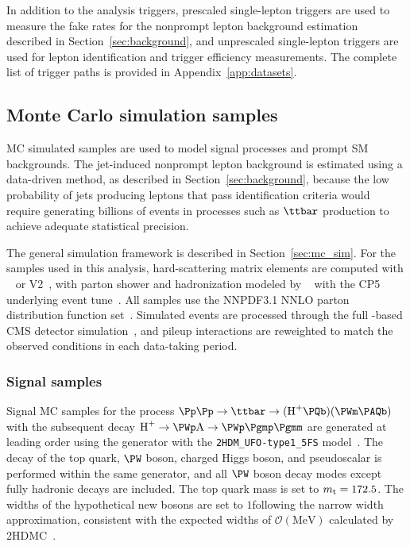 In addition to the analysis triggers, prescaled single-lepton triggers are used to measure the fake rates for the nonprompt lepton background estimation described in Section~\ref{sec:background}, and unprescaled single-lepton triggers are used for lepton identification and trigger efficiency measurements. The complete list of trigger paths is provided in Appendix~\ref{app:datasets}.

\subsection{Monte Carlo simulation samples}
\label{ssec:mc_samples}

MC simulated samples are used to model signal processes and prompt SM backgrounds. The jet-induced nonprompt lepton background is estimated using a data-driven method, as described in Section~\ref{sec:background}, because the low probability of jets producing leptons that pass identification criteria would require generating billions of events in processes such as $\ttbar$ production to achieve adequate statistical precision.

The general simulation framework is described in Section~\ref{sec:mc_sim}. For the samples used in this analysis, hard-scattering matrix elements are computed with \MGvATNLO~\cite{MG5_aMCatNLO} or \POWHEG V2~\cite{Powheg1,Powheg2,Powheg3}, with parton shower and hadronization modeled by ~\cite{Pythia8} with the CP5 underlying event tune~\cite{CPTunes}. All samples use the NNPDF3.1 NNLO parton distribution function set~\cite{NNPDF31}. Simulated events are processed through the full \GEANTfour-based CMS detector simulation~\cite{Geant4}, and pileup interactions are reweighted to match the observed conditions in each data-taking period.

\subsubsection{Signal samples}

Signal MC samples for the process $\Pp\Pp \to \ttbar \to (\PHp\PQb)(\PWm\PAQb)$ with the subsequent decay $\PHp \to \PWp\PA \to \PWp\Pgmp\Pgmm$ are generated at leading order using the \MGvATNLO generator with the \texttt{2HDM\_UFO-type1\_5FS} model~\cite{FeynRules2HDM}. The decay of the top quark, $\PW$ boson, charged Higgs boson, and pseudoscalar is performed within the same generator, and all $\PW$ boson decay modes except fully hadronic decays are included. The top quark mass is set to $m_{\text{t}} = 172.5$\GeV. The widths of the hypothetical new bosons are set to $1$\MeV following the narrow width approximation, consistent with the expected widths of $\mathcal{O}(\text{MeV})$ calculated by \textsc{2HDMC}~\cite{2HDMC}.

